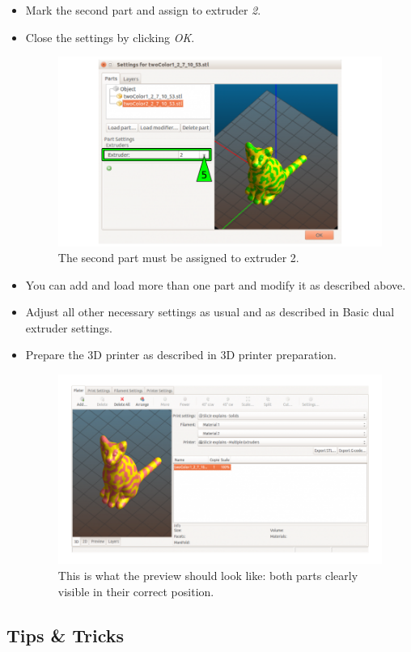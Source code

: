 \begin{itemize}
  \item Mark the second part and assign to extruder \emph{2}.
  \item Close the settings by clicking \emph{OK}.

  \begin{figure}[H]
    \centering
    \includegraphics[width=.7\linewidth]{./img/slic3r_bicolored_cat3.png}
    \caption{The second part must be assigned to extruder 2.}
  \end{figure}


  \item You can add and load more than one part and modify it as described above.
  \item Adjust all other necessary settings as usual 
        and as described in Basic dual extruder settings.
  \item Prepare the 3D printer as described in 3D printer preparation.


  \begin{figure}[H]
    \centering
    \includegraphics[width=.7\linewidth]{./img/slic3r_bicolored_cat4.png}
    \caption{This is what the preview should look like: both parts clearly 
             visible in their correct position.}
  \end{figure}

\end{itemize}

\subsection{Tips \& Tricks}

